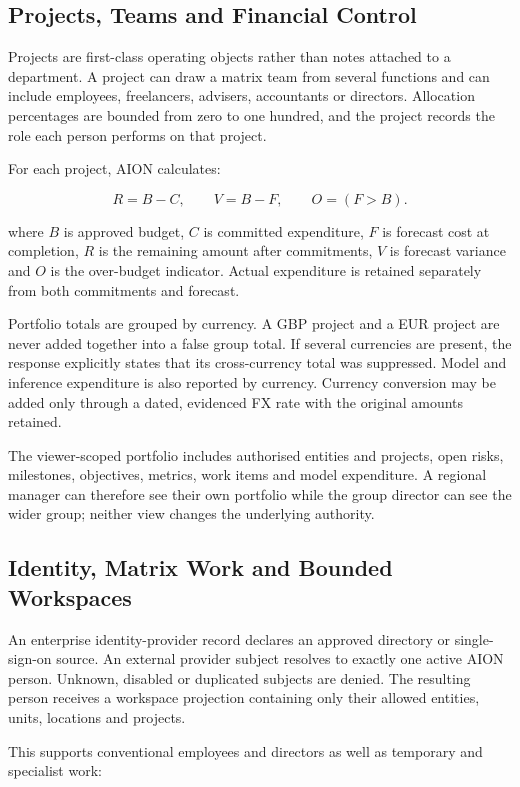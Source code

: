 \subsection{Projects, Teams and Financial Control}

Projects are first-class operating objects rather than notes attached to a department.
A project can draw a matrix team from several functions and can include employees,
freelancers, advisers, accountants or directors.  Allocation percentages are bounded from
zero to one hundred, and the project records the role each person performs on that project.

For each project, AION calculates:

\[
R=B-C,\qquad V=B-F,\qquad O=(F>B).
\]

where $B$ is approved budget, $C$ is committed expenditure, $F$ is forecast cost at
completion, $R$ is the remaining amount after commitments, $V$ is forecast variance and
$O$ is the over-budget indicator.  Actual expenditure is retained separately from both
commitments and forecast.

Portfolio totals are grouped by currency.  A GBP project and a EUR project are never added
together into a false group total.  If several currencies are present, the response explicitly
states that its cross-currency total was suppressed.  Model and inference expenditure is also
reported by currency.  Currency conversion may be added only through a dated, evidenced FX rate
with the original amounts retained.

The viewer-scoped portfolio includes authorised entities and projects, open risks, milestones,
objectives, metrics, work items and model expenditure.  A regional manager can therefore see
their own portfolio while the group director can see the wider group; neither view changes the
underlying authority.

\subsection{Identity, Matrix Work and Bounded Workspaces}

An enterprise identity-provider record declares an approved directory or single-sign-on
source.  An external provider subject resolves to exactly one active AION person.  Unknown,
disabled or duplicated subjects are denied.  The resulting person receives a workspace
projection containing only their allowed entities, units, locations and projects.

This supports conventional employees and directors as well as temporary and specialist work:

